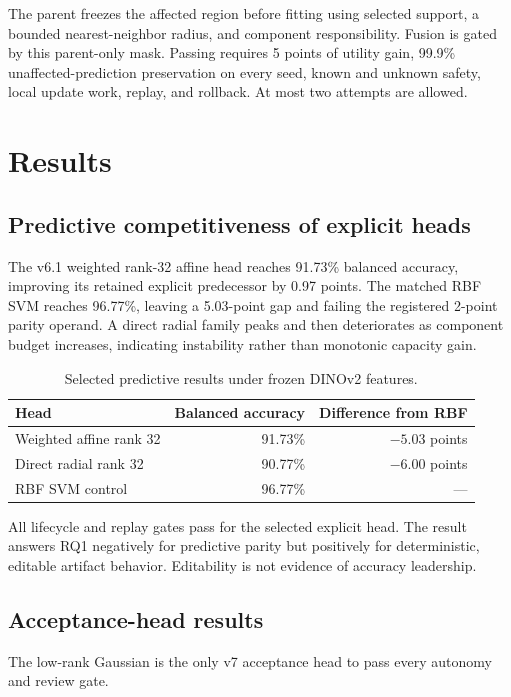 \documentclass[12pt,oneside]{report}
\begin{document}
The parent freezes the affected region before fitting using selected support,
a bounded nearest-neighbor radius, and component responsibility. Fusion is
gated by this parent-only mask. Passing requires 5 points of utility gain,
99.9\% unaffected-prediction preservation on every seed, known and unknown
safety, local update work, replay, and rollback. At most two attempts are
allowed.

\chapter{Results}

\section{Predictive competitiveness of explicit heads}

The v6.1 weighted rank-32 affine head reaches 91.73\% balanced accuracy,
improving its retained explicit predecessor by 0.97 points. The matched RBF SVM
reaches 96.77\%, leaving a 5.03-point gap and failing the registered 2-point
parity operand. A direct radial family peaks and then deteriorates as component
budget increases, indicating instability rather than monotonic capacity gain.

\begin{table}[ht]
\centering
\caption{Selected predictive results under frozen DINOv2 features.}
\label{tab:predictive}
\begin{tabular}{lrr}
\toprule
Head & Balanced accuracy & Difference from RBF \\
\midrule
Weighted affine rank 32 & 91.73\% & $-5.03$ points\\
Direct radial rank 32 & 90.77\% & $-6.00$ points\\
RBF SVM control & 96.77\% & ---\\
\bottomrule
\end{tabular}
\end{table}

All lifecycle and replay gates pass for the selected explicit head. The result
answers RQ1 negatively for predictive parity but positively for deterministic,
editable artifact behavior. Editability is not evidence of accuracy
leadership.

\section{Acceptance-head results}

The low-rank Gaussian is the only v7 acceptance head to pass every autonomy and
review gate.
\end{document}
